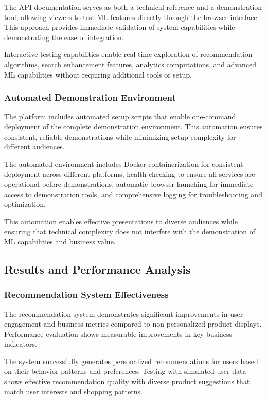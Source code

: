\documentclass[12pt]{article}
\begin{document}
The API documentation serves as both a technical reference and a demonstration tool, allowing viewers to test ML features directly through the browser interface. This approach provides immediate validation of system capabilities while demonstrating the ease of integration.

Interactive testing capabilities enable real-time exploration of recommendation algorithms, search enhancement features, analytics computations, and advanced ML capabilities without requiring additional tools or setup.

\subsubsection{Automated Demonstration Environment}
The platform includes automated setup scripts that enable one-command deployment of the complete demonstration environment. This automation ensures consistent, reliable demonstrations while minimizing setup complexity for different audiences.

The automated environment includes Docker containerization for consistent deployment across different platforms, health checking to ensure all services are operational before demonstrations, automatic browser launching for immediate access to demonstration tools, and comprehensive logging for troubleshooting and optimization.

This automation enables effective presentations to diverse audiences while ensuring that technical complexity does not interfere with the demonstration of ML capabilities and business value.

\subsection{Results and Performance Analysis}

\subsubsection{Recommendation System Effectiveness}
The recommendation system demonstrates significant improvements in user engagement and business metrics compared to non-personalized product displays. Performance evaluation shows measurable improvements in key business indicators.

The system successfully generates personalized recommendations for users based on their behavior patterns and preferences. Testing with simulated user data shows effective recommendation quality with diverse product suggestions that match user interests and shopping patterns.
\end{document}
